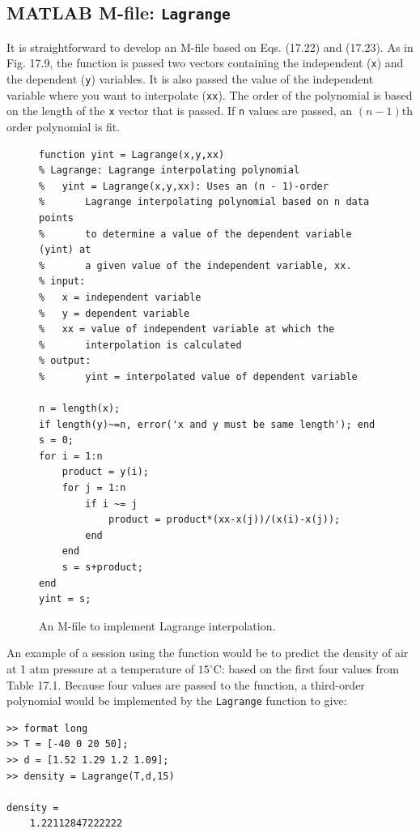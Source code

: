 \documentclass[../main.tex]{subfiles}
\begin{document}

\label{cha:cha_P_17_3_1} %
\subsection{MATLAB M-file: \texttt{Lagrange}}

\noindent It is straightforward to develop an M-file based on Eqs. (17.22) and (17.23). As in
Fig. 17.9, the function is passed two vectors containing the independent (\texttt{x}) and the
dependent (\texttt{y}) variables. It is also passed the value of the independent variable where you
want to interpolate (\texttt{xx}). The order of the polynomial is based on the length of the \texttt{x} vector
that is passed. If \texttt{n} values are passed, an $(n - 1)$th order polynomial is fit.

\begin{figure}[H] 
	\centering
	\begin{lstlisting}[numbers=none]
function yint = Lagrange(x,y,xx)
% Lagrange: Lagrange interpolating polynomial
% 	yint = Lagrange(x,y,xx): Uses an (n - 1)-order
% 		Lagrange interpolating polynomial based on n data points
% 		to determine a value of the dependent variable (yint) at
% 		a given value of the independent variable, xx.
% input:
% 	x = independent variable
% 	y = dependent variable
% 	xx = value of independent variable at which the
% 		interpolation is calculated
% output:
% 		yint = interpolated value of dependent variable

n = length(x);
if length(y)~=n, error('x and y must be same length'); end
s = 0;
for i = 1:n
	product = y(i);
	for j = 1:n
		if i ~= j
			product = product*(xx-x(j))/(x(i)-x(j));
		end
	end
	s = s+product;
end
yint = s;
	\end{lstlisting}
	\caption{\textsf{An M-file to implement Lagrange interpolation.}}
	\label{fig:fig_17_9}
\end{figure}

An example of a session using the function would be to predict the density of air at
1 atm pressure at a temperature of $15^\circ$C: based on the first four values from Table 17.1.
Because four values are passed to the function, a third-order polynomial would be implemented by the \texttt{Lagrange} function to give:

\begin{lstlisting}[numbers=none]
>> format long
>> T = [-40 0 20 50];
>> d = [1.52 1.29 1.2 1.09];
>> density = Lagrange(T,d,15)

density =
	1.22112847222222
\end{lstlisting}
\end{document}
